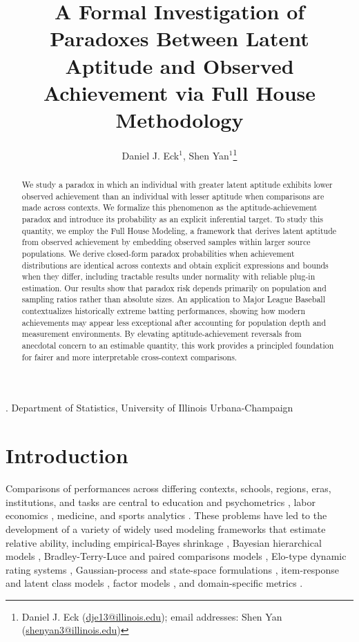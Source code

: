 \documentclass[12pt]{article}
\title{A Formal Investigation of Paradoxes Between Latent Aptitude and Observed Achievement via Full House Methodology}
\author{Daniel J. Eck$^1$, Shen Yan$^1$\thanks{Daniel J. Eck (\url{dje13@illinois.edu}); email addresses: Shen Yan (\url{shenyan3@illinois.edu})}}
\date{}
\begin{document}
\maketitle

{. Department of Statistics, University of Illinois Urbana-Champaign \\}


\begin{abstract}
We study a paradox in which an individual with greater latent aptitude exhibits lower observed achievement than an individual with lesser aptitude when comparisons are made across contexts. We formalize this phenomenon as the aptitude-achievement paradox and introduce its probability as an explicit inferential target. To study this quantity, we employ the Full House Modeling, a framework that derives latent aptitude from observed achievement by embedding observed samples within larger source populations. We derive closed-form paradox probabilities when achievement distributions are identical across contexts and obtain explicit expressions and bounds when they differ, including tractable results under normality with reliable plug-in estimation. Our results show that paradox risk depends primarily on population and sampling ratios rather than absolute sizes. An application to Major League Baseball contextualizes historically extreme batting performances, showing how modern achievements may appear less exceptional after accounting for population depth and measurement environments. By elevating aptitude-achievement reversals from anecdotal concern to an estimable quantity, this work provides a principled foundation for fairer and more interpretable cross-context comparisons.
\end{abstract}

\section{Introduction}

Comparisons of performances across differing contexts, schools, regions, eras, institutions, and tasks are central to education and psychometrics \citep{holland2012differential, bond2013applying}, labor economics \citep{nickell1999labor}, medicine, and sports analytics \citep{BRL99, SM13, SM16, winston2022mathletics, yan2025comparing}. These problems have led to the development of a variety of widely used modeling frameworks that estimate relative ability, including empirical-Bayes shrinkage \citep{efron1975data}, Bayesian hierarchical models \citep{raudenbush1986hierarchical, BRL99}, Bradley-Terry-Luce and paired comparisons models \citep{bradley1952rank, bradley1976science, bradley1984paired, david1988paired}, Elo-type dynamic rating systems \citep{elo1978rating, graepel2007bayesian}, Gaussian-process and state-space formulations \citep{chu2005gaussian, houlsby2012collaborative}, item-response and latent class models \citep{mcdonald1999test, embretson2000item, hagenaars2002applied, holland2012differential, bond2013applying}, factor models \citep{mcdonald1999test, bartholomew2011latent}, and domain-specific metrics \citep{baumer2014statistician, BB15, yu2016pantheon}.
\end{document}
